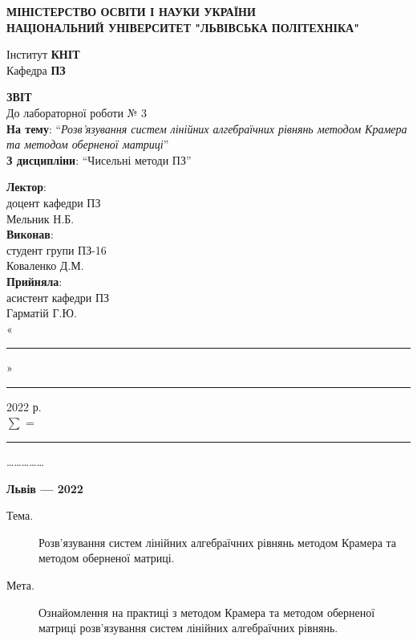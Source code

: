 \documentclass{article}
\newcommand\subject{Чисельні методи ПЗ}
\newcommand\lecturer{доцент кафедри ПЗ\\Мельник Н.Б.}
\newcommand\teacher{асистент кафедри ПЗ\\Гарматій Г.Ю.}
\newcommand\mygroup{ПЗ-16}
\newcommand\lab{3}
\newcommand\theme{Розв’язування систем лінійних алгебраїчних рівнянь методом Крамера та методом оберненої матриці}
\newcommand\purpose{Ознайомлення на практиці з методом Крамера та методом
	оберненої матриці розв’язування систем лінійних алгебраїчних рівнянь}
\begin{document}
	\begin{large}
		\begin{titlepage}
			\thispagestyle{empty}
			\begin{center}
				\textbf{МІНІСТЕРСТВО ОСВІТИ І НАУКИ УКРАЇНИ\\
					НАЦІОНАЛЬНИЙ УНІВЕРСИТЕТ "ЛЬВІВСЬКА ПОЛІТЕХНІКА"}
			\end{center}
			\begin{flushright}
				Інститут \textbf{КНІТ}\\
				Кафедра \textbf{ПЗ}
			\end{flushright}
			\vspace{200pt}
			\begin{center}
				\textbf{ЗВІТ}\\
				\vspace{10pt}
				До лабораторної роботи № \lab\\
				\textbf{На тему}: “\textit{\theme}”\\
				\textbf{З дисципліни}: “\subject”
			\end{center}
			\vspace{90pt}
			\begin{flushright}
				
				\textbf{Лектор}:\\
				\lecturer\\
				\vspace{28pt}
				\textbf{Виконав}:\\
				
				студент групи \mygroup\\
				Коваленко Д.М.\\
				\vspace{28pt}
				\textbf{Прийняла}:\\
				
				\teacher\\
				
				\vspace{28pt}
				«\rule{1cm}{0.15mm}» \rule{1.5cm}{0.15mm} 2022 р.\\
				$\sum$ = \rule{1cm}{0.15mm}……………\\
				
			\end{flushright}
			\vspace{\fill}
			\begin{center}
				\textbf{Львів — 2022}
			\end{center}
		\end{titlepage}
		
		\begin{description}
			\item[Тема.] \theme.
			\item[Мета.] \purpose.
		\end{description}
		

\end{large}
\end{document}
